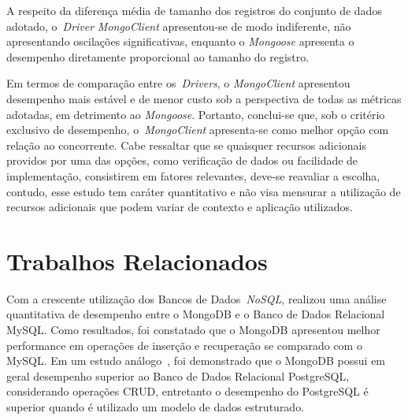 \documentclass[12pt]{article}
\begin{document}
A respeito da diferença média de tamanho dos registros do conjunto de dados adotado, o~\emph{Driver} \emph{MongoClient} apresentou-se de modo indiferente, não apresentando oscilações significativas, enquanto o \emph{Mongoose} apresenta o desempenho diretamente proporcional ao tamanho do registro.

Em termos de comparação entre os~\emph{Drivers}, o \emph{MongoClient} apresentou desempenho mais estável e de menor custo sob a perspectiva de todas as métricas adotadas, em detrimento ao \emph{Mongoose}. Portanto, conclui-se que, sob o critério exclusivo de desempenho, o~\emph{MongoClient} apresenta-se como melhor opção com relação ao concorrente. Cabe ressaltar que se quaisquer recursos adicionais providos por uma das opções, como verificação de dados ou facilidade de implementação, consistirem em fatores relevantes, deve-se reavaliar a escolha, contudo, esse estudo tem caráter quantitativo e não visa mensurar a utilização de recursos adicionais que podem variar de contexto e aplicação utilizados.




\section{Trabalhos Relacionados} 
\label{section:relacionados}

Com a crescente utilização dos Bancos de Dados~\emph{NoSQL}, \cite{patil:2017} realizou uma análise quantitativa de desempenho entre o MongoDB e o Banco de Dados Relacional MySQL. Como resultados, foi constatado que o MongoDB apresentou melhor performance em operações de inserção e recuperação se comparado com o MySQL. 
Em um estudo análogo~\cite{jung:2015}, foi demonstrado que o MongoDB possui em geral desempenho superior ao Banco de Dados Relacional PostgreSQL, considerando operações CRUD, entretanto o desempenho do PostgreSQL é superior quando é utilizado um modelo de dados estruturado.
\end{document}

